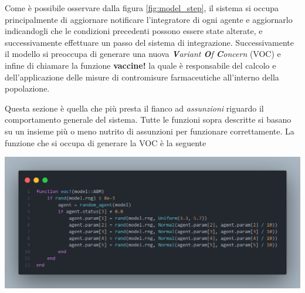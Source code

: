 Come è possibile osservare dalla figura \ref{fig:model_step}, il sistema si occupa principalmente
di aggiornare notificare l'integratore di ogni agente e aggiornarlo indicandogli che le condizioni
precedenti possono essere state alterate, e successivamente effettuare un passo del sistema di 
integrazione. Successivamente il modello si preoccupa di generare una nuova \emph{\textbf{V}ariant \textbf{O}f \textbf{C}oncern} (VOC)
e infine di chiamare la funzione \textbf{vaccine!} la quale è responsabile del calcolo e dell'applicazione 
delle misure di contromisure farmaceutiche all'interno della popolazione. 

Questa sezione è quella che più presta il fianco ad \emph{assunzioni} riguardo 
il comportamento generale del sistema. Tutte le funzioni sopra descritte si basano su un insieme
più o meno nutrito di assunzioni per funzionare correttamente. 
La funzione che si occupa di generare la VOC è la seguente

\begin{minipage}{\linewidth}
	\centering
	\includegraphics[width=\textwidth]{img/voc.png}
	\label{fig:voc}
\end{minipage}

